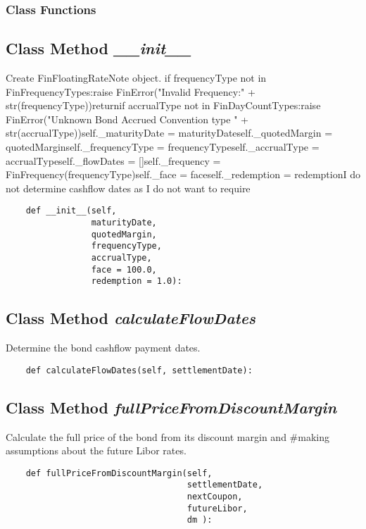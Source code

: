 \documentclass[twoside,11pt]{book}
\begin{document}
\subsubsection{Class Functions}

\subsection{Class Method {\it \_\_init\_\_}}
Create FinFloatingRateNote object. if frequencyType not in FinFrequencyTypes:raise FinError("Invalid Frequency:" + str(frequencyType))returnif accrualType not in FinDayCountTypes:raise FinError("Unknown Bond Accrued Convention type " + str(accrualType))self.\_maturityDate = maturityDateself.\_quotedMargin = quotedMarginself.\_frequencyType = frequencyTypeself.\_accrualType = accrualTypeself.\_flowDates = []self.\_frequency = FinFrequency(frequencyType)self.\_face = faceself.\_redemption = redemptionI do not determine cashflow dates as I do not want to require

\begin{lstlisting}
    def __init__(self, 
                 maturityDate,
                 quotedMargin,
                 frequencyType, 
                 accrualType,
                 face = 100.0, 
                 redemption = 1.0):
\end{lstlisting}

\subsection{Class Method {\it calculateFlowDates}}
Determine the bond cashflow payment dates. 

\begin{lstlisting}
    def calculateFlowDates(self, settlementDate):
\end{lstlisting}

\subsection{Class Method {\it fullPriceFromDiscountMargin}}
Calculate the full price of the bond from its discount margin and \#making assumptions about the future Libor rates. 

\begin{lstlisting}
    def fullPriceFromDiscountMargin(self, 
                                    settlementDate,
                                    nextCoupon,
                                    futureLibor,
                                    dm ):
\end{lstlisting}
\end{document}
